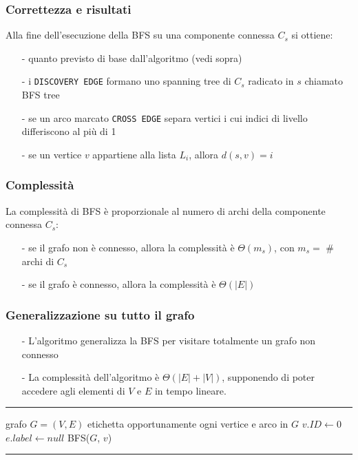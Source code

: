 \documentclass[a4paper]{article}
\makeatletter
\newenvironment{algo}[4]{
	\noindent\rule{\textwidth}{0.4pt}
	\begin{algorithmic}[1]
		\addtocounter{ALG@line}{-1}
		\Procedure{#1}{#2}
		\Require #3
		\Ensure #4
		\Statex }{
		\EndProcedure
	\end{algorithmic}
	\rule{\textwidth}{0.4pt}}
\makeatother
\begin{document}
\subsubsection*{Correttezza e risultati}
Alla fine dell'esecuzione della BFS su una componente connessa \(C_s\) si ottiene:
\begin{itemize}[topsep=3pt, itemsep=0pt]
	\item[-] quanto previsto di base dall'algoritmo (vedi sopra)
	\item[-] i \verb|DISCOVERY EDGE| formano uno spanning tree di \(C_s\) radicato in \(s\) chiamato BFS tree
	\item[-] se un arco marcato \verb|CROSS EDGE| separa vertici i cui indici di livello differiscono al più di 1
	\item[-] se un vertice \(v\) appartiene alla lista \(L_i\), allora \(d(s,v) = i\)
\end{itemize}

\subsubsection*{Complessità}
La complessità di BFS è proporzionale al numero di archi della componente connessa \(C_s\):
\begin{itemize}[topsep=3pt, itemsep=0pt]
	\item[-] se il grafo non è connesso, allora la complessità è \(\Theta(m_s)\), con \(m_s = \) \# archi di \(C_s\)
	\item[-] se il grafo è connesso, allora la complessità è \(\Theta(|E|)\)
\end{itemize}

\subsubsection*{Generalizzazione su tutto il grafo}
\begin{itemize}[topsep=3pt, itemsep=0pt]
	\item[-] L'algoritmo generalizza la BFS per visitare totalmente un grafo non connesso
	\item[-] La complessità dell'algoritmo è \(\Theta(|E| + |V|)\), supponendo di poter accedere agli elementi di \(V\) e \(E\)
	in tempo lineare.
\end{itemize}
\begin{algo}{BFSComplete}{$G$}{grafo $G = (V,E)$}{etichetta opportunamente ogni vertice e arco in \(G\)}
		\State \(v.I\!D \gets 0\)
	\EndFor
		\State \(e.label \gets null\)
	\EndFor
			\State BFS(\(G\), \(v\))
		\EndIf
	\EndFor
\end{algo}
\end{document}
